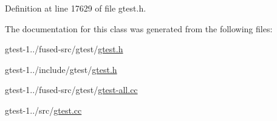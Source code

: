\-Definition at line 17629 of file gtest.\-h.



\-The documentation for this class was generated from the following files\-:\begin{DoxyCompactItemize}
\item 
gtest-\/1../fused-\/src/gtest/\hyperlink{fused-src_2gtest_2gtest_8h}{gtest.\-h}\item 
gtest-\/1../include/gtest/\hyperlink{include_2gtest_2gtest_8h}{gtest.\-h}\item 
gtest-\/1../fused-\/src/gtest/\hyperlink{fused-src_2gtest_2gtest-all_8cc}{gtest-\/all.\-cc}\item 
gtest-\/1../src/\hyperlink{gtest_8cc}{gtest.\-cc}\end{DoxyCompactItemize}
